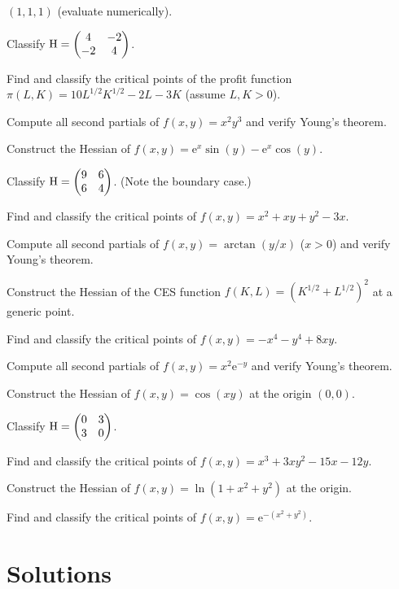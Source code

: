 \begin{problems}
        $(1,1,1)$ (evaluate numerically).
  \item Classify $\operatorname{H} = \begin{pmatrix}4&-2\\-2&4\end{pmatrix}$.
  \item Find and classify the critical points of the profit function
        $\pi(L,K) = 10L^{1/2}K^{1/2} - 2L - 3K$ (assume $L,K>0$).
  \item Compute all second partials of $f(x,y) = x^{2}y^{3}$ and verify
        Young's theorem.
  \item Construct the Hessian of
        $f(x,y) = \mathrm{e}^{x}\sin(y) - \mathrm{e}^{x}\cos(y)$.
  \item Classify $\operatorname{H} = \begin{pmatrix}9&6\\6&4\end{pmatrix}$. (Note the
        boundary case.)
  \item Find and classify the critical points of
        $f(x,y) = x^{2} + xy + y^{2} - 3x$.
  \item Compute all second partials of $f(x,y) = \arctan(y/x)$ ($x>0$) and
        verify Young's theorem.
  \item Construct the Hessian of the CES function
        $f(K,L) = (K^{1/2}+L^{1/2})^{2}$ at a generic point.
  \item Find and classify the critical points of
        $f(x,y) = -x^{4} - y^{4} + 8xy$.
  \item Compute all second partials of $f(x,y) = x^{2}\mathrm{e}^{-y}$ and
        verify Young's theorem.
  \item Construct the Hessian of $f(x,y) = \cos(xy)$ at the origin
        $(0,0)$.
  \item Classify $\operatorname{H} = \begin{pmatrix}0&3\\3&0\end{pmatrix}$.
  \item Find and classify the critical points of
        $f(x,y) = x^{3} + 3xy^{2} - 15x - 12y$.
  \item Construct the Hessian of $f(x,y) = \ln(1+x^{2}+y^{2})$ at the
        origin.
  \item Find and classify the critical points of
        $f(x,y) = \mathrm{e}^{-(x^{2}+y^{2})}$.
\end{problems}

\section{Solutions}

